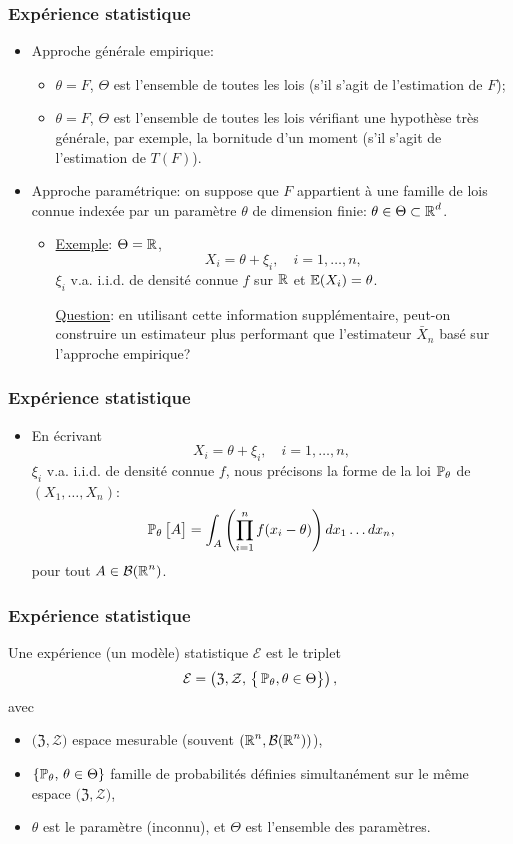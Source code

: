 \begin{frame}
\frametitle{Expérience statistique}
\begin{itemize}
\item Approche g\'en\'erale empirique:
\begin{itemize}
\item $\theta=F$, $\Theta$ est l'ensemble de
toutes les lois (s'il s'agit de l'estimation de $F$);
\item $\theta=F$, $\Theta$ est l'ensemble de
toutes les lois v\'erifiant une hypoth\`ese tr\`es g\'en\'erale, par
exemple, la bornitude d'un moment (s'il s'agit de l'estimation de
$T(F)$).
\end{itemize}
\item Approche param\'etrique: \alert{on suppose} que $F$ appartient \`a une
\alert{famille de lois connue} index\'ee par un param\`etre
$\theta$ de dimension finie: $\theta\in \Theta \subset \operatorname{{\mathbb R}}^d$.
\begin{itemize}
\item \underline{Exemple}: $\Theta = \operatorname{{\mathbb R}}$,
$$ X_i= \theta +\xi_i, \quad i=1,\dots,n,$$
$\xi_i$ v.a. i.i.d. de densit\'e \alert{connue} $f$ sur $\operatorname{{\mathbb R}}$
et $\operatorname{{\mathbb E}}(X_i)=\theta$.

\underline{Question}: en utilisant cette information
suppl\'ementaire, peut-on construire un estimateur plus performant
que l'estimateur $\bar X_n$ bas\'e sur l'approche empirique?
\end{itemize}
%
\end{itemize}
\end{frame}


\begin{frame}
\frametitle{Expérience statistique}
\begin{itemize}
\item En \'ecrivant
$$ X_i= \theta +\xi_i, \quad i=1,\dots,n,$$
$\xi_i$ v.a. i.i.d. de densit\'e \alert{connue} $f$, nous
pr\'ecisons la forme de la loi $\operatorname{{\mathbb P}}_{\theta}$ de
$(X_1,\dots,X_n)$:
$$\operatorname{{\mathbb P}}_\theta\big[A\big] = \int_A
\left(\prod_{i=1}^n f(x_i-\theta)\right) dx_1\ldots dx_n,
$$
pour tout $A\in {\mathcal B}(\operatorname{{\mathbb R}}^n)$.
\end{itemize}
\end{frame}


\begin{frame}
\frametitle{Expérience statistique}
\begin{df}
Une expérience (un modèle) statistique ${\mathcal E}$ est le triplet
$${\mathcal E} = \left(\mathfrak{Z}, {\mathcal Z}, \,\big\{\operatorname{{\mathbb P}}_\theta, \theta \in \Theta\big\}\right),$$
avec
\begin{itemize}
\item $\big(\mathfrak{Z}, {\mathcal Z}\big)$ espace mesurable (souvent
$(\operatorname{{\mathbb R}}^n,{\mathcal B}(\operatorname{{\mathbb R}}^n))$),
\item $\{\operatorname{{\mathbb P}}_\theta,\,\theta \in \Theta\}$ famille de probabilités définies \alert{simultanément} sur le même espace  $\big(\mathfrak{Z}, {\mathcal Z}\big)$,
\item $\theta$ est le \alert{paramètre (inconnu)}, et $\Theta$ est \alert{ l'ensemble des paramètres}.
\end{itemize}
\end{df}
\end{frame}



